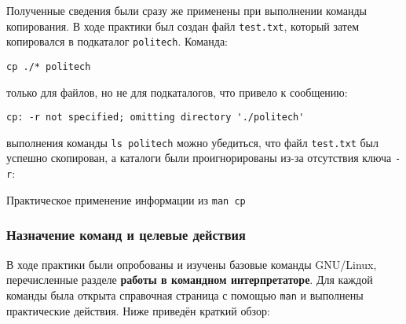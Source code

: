 Полученные сведения были сразу же применены при выполнении команды копирования. В ходе практики был создан файл \texttt{test.txt}, который затем копировался в подкаталог \texttt{politech}. Команда:

\begin{verbatim}
cp ./* politech
\end{verbatim}

 только для файлов, но не для подкаталогов, что привело к сообщению:

\begin{verbatim}
cp: -r not specified; omitting directory './politech'
\end{verbatim}

 выполнения команды \texttt{ls politech} можно убедиться, что файл \texttt{test.txt} был успешно скопирован, а каталоги были проигнорированы из-за отсутствия ключа \texttt{-r}:

{Практическое применение информации из \texttt{man cp}}

\subsubsection{Назначение команд и целевые действия}

В ходе практики были опробованы и изучены базовые команды GNU/Linux, перечисленные разделе \textbf{ работы в командном интерпретаторе\frqq}. Для каждой команды была открыта справочная страница с помощью \texttt{man} и выполнены практические действия. Ниже приведён краткий обзор:


